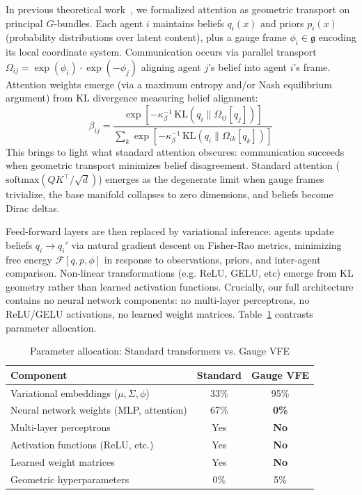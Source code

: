 \documentclass[twoside,11pt]{article}
\begin{document}
In previous theoretical work~\citep{Dennis2025}, we formalized attention as geometric transport on principal $G$-bundles. Each agent $i$ maintains beliefs $q_i(x)$ and priors $p_i(x)$ (probability distributions over latent content), plus a gauge frame $\phi_i \in \mathfrak{g}$ encoding its local coordinate system. Communication occurs via parallel transport $\Omega_{ij} = \exp(\phi_i) \cdot \exp(-\phi_j)$ aligning agent $j$'s belief into agent $i$'s frame. Attention weights emerge (via a maximum entropy and/or Nash equilibrium argument) from KL divergence measuring belief alignment:
%
\begin{equation}
\beta_{ij} = \frac{\exp\!\left[-\kappa_\beta^{-1} \, \mathrm{KL}(q_i \| \Omega_{ij}[q_j])\right]}{\sum_k \exp\!\left[-\kappa_\beta^{-1} \, \mathrm{KL}(q_i \| \Omega_{ik}[q_k])\right]}
\end{equation}
%
This brings to light what standard attention obscures: communication succeeds when geometric transport minimizes belief disagreement. Standard attention ($\mathrm{softmax}(QK^\top/\sqrt{d})$) emerges as the degenerate limit when gauge frames trivialize, the base manifold collapses to zero dimensions, and beliefs become Dirac deltas.

Feed-forward layers are then replaced by variational inference: agents update beliefs $q_i \to q_i'$ via natural gradient descent on Fisher-Rao metrics, minimizing free energy $\mathcal{F}[q,p, \phi]$ in response to observations, priors, and inter-agent comparison. Non-linear transformations (e.g. ReLU, GELU, etc) emerge from KL geometry rather than learned activation functions. Crucially, our full architecture contains no neural network components: no multi-layer perceptrons, no ReLU/GELU activations, no learned weight matrices. Table~\ref{tab:params} contrasts parameter allocation.

\begin{table}[t]
\centering
\caption{Parameter allocation: Standard transformers vs. Gauge VFE}
\label{tab:params}
\begin{tabular}{lcc}
\toprule
\textbf{Component} & \textbf{Standard} & \textbf{Gauge VFE} \\
\midrule
Variational embeddings ($\mu, \Sigma, \phi$) & 33\% & 95\% \\
Neural network weights (MLP, attention) & 67\% & \textbf{0\%} \\
Multi-layer perceptrons & Yes & \textbf{No} \\
Activation functions (ReLU, etc.) & Yes & \textbf{No} \\
Learned weight matrices & Yes & \textbf{No} \\
Geometric hyperparameters & 0\% & 5\% \\
\bottomrule
\end{tabular}
\end{table}
\end{document}
